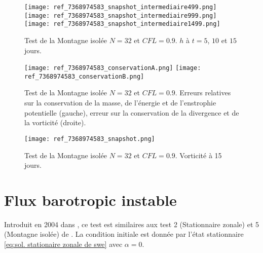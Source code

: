 \begin{figure}[htbp]
\begin{center}
\texttt{[image: ref\_7368974583\_snapshot\_intermediaire499.png]}\\
\texttt{[image: ref\_7368974583\_snapshot\_intermediaire999.png]}\\
\texttt{[image: ref\_7368974583\_snapshot\_intermediaire1499.png]}
\end{center}
\caption{Test de la Montagne isolée \cite{Williamson1992} $N=32$ et $CFL=0.9$. $h$ à $t=5$, $10$ et $15$ jours.}
\label{fig: williamson 5 space height}
\end{figure}

\begin{figure}[htbp]
\begin{center}
\texttt{[image: ref\_7368974583\_conservationA.png]}
\texttt{[image: ref\_7368974583\_conservationB.png]}
\end{center}
\caption{Test de la Montagne isolée \cite{Williamson1992} $N=32$ et $CFL=0.9$. Erreurs relatives sur la conservation de la masse, de l'énergie et de l'enstrophie potentielle (gauche), erreur sur la conservation de la divergence et de la vorticité (droite).}
\label{fig: williamson 5 conservation}
\end{figure}

\begin{figure}[htbp]
\begin{center}
\texttt{[image: ref\_7368974583\_snapshot.png]}
\end{center}
\caption{Test de la Montagne isolée \cite{Williamson1992} $N=32$ et $CFL=0.9$. Vorticité à 15 jours.}
\label{fig: williamson 5 vorticité}
\end{figure}


















\newpage
\section{Flux barotropic instable}

Introduit en 2004 dans \cite{Galewsky2004}, ce test est similaires aux test 2 (Stationnaire zonale) et 5 (Montagne isolée) de \cite{Williamson1992}. La condition initiale est donnée par l'état stationnaire \eqref{eq:sol. stationaire zonale de swe} avec $\alpha=0$.

